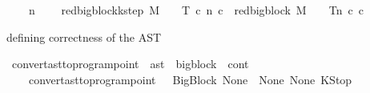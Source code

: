 \begin{isabellebody}
\ \ {\isacharparenleft}{\kern0pt}{\isachardoublequoteopen}{\isacharunderscore}{\kern0pt}{\isacharcomma}{\kern0pt}{\isacharunderscore}{\kern0pt}{\isacharcomma}{\kern0pt}{\isacharunderscore}{\kern0pt}{\isacharcomma}{\kern0pt}{\isacharunderscore}{\kern0pt}{\isacharcomma}{\kern0pt}{\isacharunderscore}{\kern0pt}\ {\isasymturnstile}{\isacharunderscore}{\kern0pt}\ {\isacharminus}{\kern0pt}n{\isasymlongrightarrow}{\isacharcircum}{\kern0pt}{\isacharunderscore}{\kern0pt}{\isacharslash}{\kern0pt}\ {\isacharunderscore}{\kern0pt}{\isachardoublequoteclose}\ {\isacharbrackleft}{\kern0pt}{}{}{\isacharcomma}{\kern0pt}{}{\isacharcomma}{\kern0pt}{}{\isacharcomma}{\kern0pt}{}{\isacharcomma}{\kern0pt}{}{\isacharbrackright}{\kern0pt}\ {}{}{\isacharparenright}{\kern0pt}\isanewline
{}\ {\isachardoublequoteopen}red{\isacharunderscore}{\kern0pt}bigblock{\isacharunderscore}{\kern0pt}k{\isacharunderscore}{\kern0pt}step\ M\ {\isasymLambda}\ {\isasymGamma}\ {\isasymOmega}\ T\ c{}\ n\ c{}\ {\isasymequiv}\ {\isacharparenleft}{\kern0pt}{\isacharparenleft}{\kern0pt}red{\isacharunderscore}{\kern0pt}bigblock\ M\ {\isasymLambda}\ {\isasymGamma}\ {\isasymOmega}\ T{\isacharparenright}{\kern0pt}{\isacharcircum}{\kern0pt}{\isacharcircum}{\kern0pt}n{\isacharparenright}{\kern0pt}\ c{}\ c{}{\isachardoublequoteclose}\isanewline
\isanewline
{}\isamarkupfalse%
%
\isadelimdocument
%
\endisadelimdocument
%
\isatagdocument
%
\isamarkuptrue%
%
\endisatagdocument
{\isafolddocument}%
%
\isadelimdocument
%
\endisadelimdocument
%
\begin{isamarkuptext}%
defining correctness of the AST%
\end{isamarkuptext}\isamarkuptrue%
\isamarkupfalse%
\ convert{\isacharunderscore}{\kern0pt}ast{\isacharunderscore}{\kern0pt}to{\isacharunderscore}{\kern0pt}program{\isacharunderscore}{\kern0pt}point\ {\isacharcolon}{\kern0pt}{\isacharcolon}{\kern0pt}\ {\isachardoublequoteopen}ast\ {\isasymRightarrow}\ bigblock\ {\isasymtimes}\ cont{\isachardoublequoteclose}\ \isanewline
\ \ \ \ {\isachardoublequoteopen}convert{\isacharunderscore}{\kern0pt}ast{\isacharunderscore}{\kern0pt}to{\isacharunderscore}{\kern0pt}program{\isacharunderscore}{\kern0pt}point\ {\isacharbrackleft}{\kern0pt}{\isacharbrackright}{\kern0pt}\ {\isacharequal}{\kern0pt}\ {\isacharparenleft}{\kern0pt}{\isacharparenleft}{\kern0pt}BigBlock\ None\ {\isacharbrackleft}{\kern0pt}{\isacharbrackright}{\kern0pt}\ None\ None{\isacharparenright}{\kern0pt}{\isacharcomma}{\kern0pt}\ KStop{\isacharparenright}{\kern0pt}{\isachardoublequoteclose}\isanewline

\end{isabellebody}
